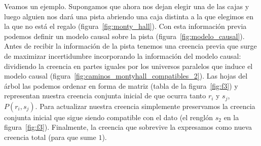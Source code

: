 \documentclass[a4paper,11pt]{book}
\theoremstyle{definition}
\begin{document}
Veamos un ejemplo.
%
Supongamos que ahora nos dejan elegir una de las cajas y luego alguien nos dar\'a una pista abriendo una caja distinta a la que elegimos en la que no est\'a el regalo (figura~\ref{fig:monty_hall}).
%
Con esta informaci\'on previa podemos definir un modelo causal sobre la pista (figura~\ref{fig:modelo_causal}).
%
Antes de recibir la informaci\'on de la pista tenemos una creencia previa que surge de maximizar incertidumbre incorporando la informaci\'on del modelo causal: dividiendo la creencia en partes iguales por los universos paralelos que induce el modelo causal (figura~\ref{fig:caminos_montyhall_compatibles_2}).
%
Las hojas del \'arbol las podemos ordenar en forma de matriz (tabla de la figura~\ref{fig:f3}) y representan nuestra creencia conjunta inicial de que ocurra tanto $r_i$ y $s_j$, $P(r_i,s_j)$.
%
Para actualizar nuestra creencia simplemente preservamos la creencia conjunta inicial que sigue siendo compatible con el dato (el rengl\'on $s_2$ en la figura~\ref{fig:f3}).
%
Finalmente, la creencia que sobrevive la expresamos como nueva creencia total (para que sume $1$).
%
\end{document}
